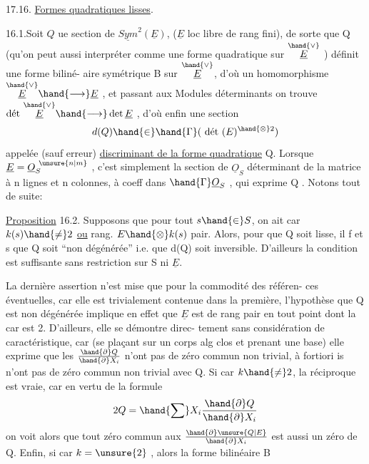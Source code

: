   

17.16. \uline{Formes quadratiques lisses}.

16.1.Soit $Q$ ue section de $\underline{Sym}^2(\underline{E})$, ($\underline{E}$ loc libre de rang fini),
de sorte que Q  (qu'on peut aussi interpréter comme une forme
quadratique sur $\overset{\hand{\vee}}{\underline{E}}$ )  définit une forme biliné-%
aire symétrique B sur $\overset{\hand{\vee}}{\underline{E}}$, d'où un homomorphisme $\overset{\hand{\vee}}{\underline{E}} \hand{\longrightarrow} \underline{E}$ , et passant aux
Modules déterminants on trouve $\text{dét}\ \overset{\hand{\vee}}{\underline{E}} \hand{\longrightarrow} \det \underline{E}$ , d'où enfin une section
\[ d(Q) \hand{\in} \hand{\Gamma}(\ \text{dét}\ (E)^{\hand{\otimes} 2}) \]
appelée (sauf erreur) \uline{discriminant de la forme quadratique} Q. Lorsque
$\underline{E} = \underline{O}_S^{\ \unsure{n|m}}$ , c'est simplement la section de $\underline{O}_S$ déterminant de la matrice
à n lignes et n colonnes, à coeff dans $\hand{\Gamma}\underline{O}_S$ , qui exprime Q . Notons tout
de suite:

\uline{Proposition} 16.2. Supposons que pour tout $s \hand{\in} S$, on ait car $k(s) \hand{\neq} 2$ \uline{ou}
rang. $E\hand{\otimes} k(s)$ pair. Alors, pour que Q soit lisse, il f et s que Q soit
``non dégénérée'' i.e. que d(Q) soit inversible. \hand{(}D'ailleurs la condition est
suffisante sans restriction sur S ni $\underline{E}$\hand{)}.

La dernière assertion n'est mise que pour la commodité des référen-%
ces éventuelles, car elle est trivialement contenue dans la première,
l'hypothèse que Q est non dégénérée implique en effet que $\underline{E}$ est de rang
pair en tout point dont la car est 2. D'ailleurs, elle se démontre direc-%
tement sans considération de caractéristique, car (se plaçant sur un corps
alg clos et prenant une base) elle exprime que les $\frac{\hand{\partial} Q}{\hand{\partial} X_i}$ n'ont pas de zéro commun
non trivial, à fortiori is n'ont pas de zéro commun non trivial avec Q.
Si car $k \hand{\neq} 2$, la réciproque est vraie, car en vertu de la formule
\[ 2Q = \hand{\sum} X_i \frac{\hand{\partial} Q}{\hand{\partial} X_i} \]
on voit alors que tout zéro commun aux $\frac{\hand{\partial} \unsure{Q|E}}{\hand{\partial} X_i}$ est aussi un zéro de Q. Enfin,
si car $k = \unsure{2}$ ,  alors la forme bilinéaire B

